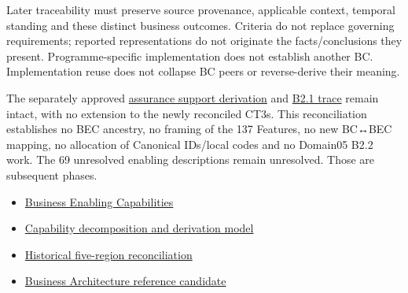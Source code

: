 Later traceability must preserve source provenance, applicable context, temporal standing and these distinct business outcomes. Criteria do not replace governing requirements; reported representations do not originate the facts/\allowbreak{}conclusions they present. Programme-specific implementation does not establish another BC. Implementation reuse does not collapse BC peers or reverse-derive their meaning.

\label{rad:business:1314}

The separately approved \hyperref[rad:assurance-strategy]{assurance support derivation} and \hyperref[rad:b2-1]{B2.1 trace} remain intact, with no extension to the newly reconciled CT3s. This reconciliation establishes no BEC ancestry, no framing of the 137 Features, no new BC↔BEC mapping, no allocation of Canonical IDs/\allowbreak{}local codes and no Domain05 B2.2 work. The 69 unresolved enabling descriptions remain unresolved. Those are subsequent phases.

\label{rad:business:1321}

\begin{itemize}

\item
\hyperref[rad:enabling]{Business Enabling Capabilities}



\item
\hyperref[rad:tier-model]{Capability decomposition and derivation model}



\item
\href{https://github.com/fhirfactory/harmonia/blob/98410db60155198a75f74c79d98060070209faa1/docs/markdown/02-strategy/reviews/business-capability-five-region-reconciliation.md}{Historical five-region reconciliation}



\item
\href{https://github.com/fhirfactory/harmonia/blob/98410db60155198a75f74c79d98060070209faa1/docs/markdown/03-business-architecture/reference-model/README.md}{Business Architecture reference candidate}



\end{itemize}
